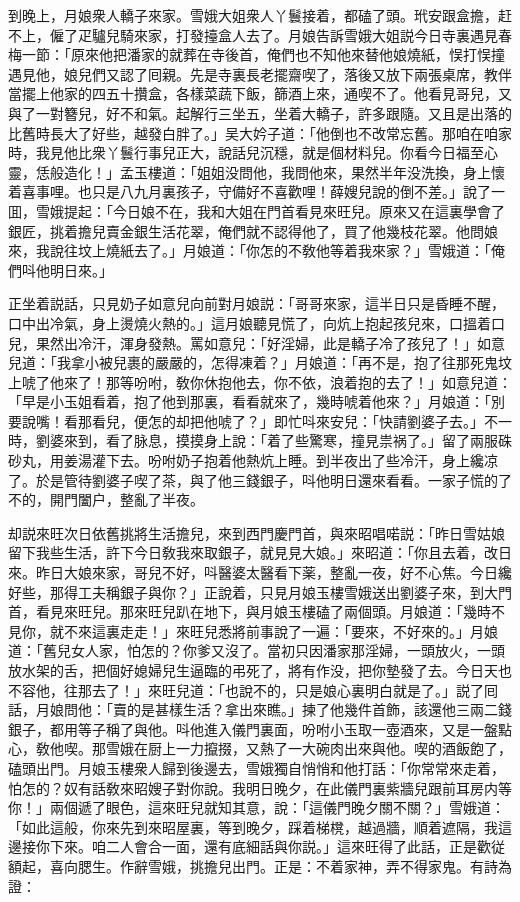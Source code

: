到晚上，月娘衆人轎子來家。雪娥大姐衆人丫鬟接着，都磕了頭。玳安跟盒擔，赶不上，僱了疋驢兒騎來家，打發擡盒人去了。月娘告訴雪娥大姐説今日寺裏遇見春梅一節：「原來他把潘家的就葬在寺後首，俺們也不知他來替他娘燒紙，悮打悮撞遇見他，娘兒們又認了囘親。先是寺裏長老擺齋喫了，落後又放下兩張桌席，教伴當擺上他家的四五十攢盒，各樣菜蔬下飯，篩酒上來，通喫不了。他看見哥兒，又與了一對簪兒，好不和氣。起解行三坐五，坐着大轎子，許多跟隨。又且是出落的比舊時長大了好些，越發白胖了。」吴大妗子道：「他倒也不改常忘舊。那咱在咱家時，我見他比衆丫鬟行事兒正大，說話兒沉穩，就是個材料兒。你看今日福至心靈，恁般造化！」孟玉樓道：「姐姐没問他，我問他來，果然半年没洗換，身上懷着喜事哩。也只是八九月裏孩子，守備好不喜歡哩！薛嫂兒說的倒不差。」說了一囬，雪娥提起：「今日娘不在，我和大姐在門首看見來旺兒。原來又在這裏學會了銀匠，挑着擔兒賣金銀生活花翠，俺們就不認得他了，買了他幾枝花翠。他問娘來，我說往坟上燒紙去了。」月娘道：「你怎的不敎他等着我來家？」雪娥道：「俺們呌他明日來。」

正坐着説話，只見奶子如意兒向前對月娘説：「哥哥來家，這半日只是昏睡不醒，口中出冷氣，身上燙燒火熱的。」這月娘聽見慌了，向炕上抱起孩兒來，口搵着口兒，果然出冷汗，渾身發熱。罵如意兒：「好淫婦，此是轎子冷了孩兒了！」如意兒道：「我拿小被兒裹的嚴嚴的，怎得凍着？」月娘道：「再不是，抱了往那死鬼坟上唬了他來了！那等吩咐，敎你休抱他去，你不依，浪着抱的去了！」如意兒道：「早是小玉姐看着，抱了他到那裏，看看就來了，幾時唬着他來？」月娘道：「別要說嘴！看那看兒，便怎的却把他唬了？」即忙呌來安兒：「快請劉婆子去。」不一時，劉婆來到，看了脉息，摸摸身上說：「着了些驚寒，撞見祟祸了。」留了兩服硃砂丸，用姜湯灌下去。吩咐奶子抱着他熱炕上睡。到半夜出了些冷汗，身上纔凉了。於是管待劉婆子喫了茶，與了他三錢銀子，呌他明日還來看看。一家子慌的了不的，開門闔户，整亂了半夜。

却説來旺次日依舊挑將生活擔兒，來到西門慶門首，與來昭唱喏説：「昨日雪姑娘留下我些生活，許下今日敎我來取銀子，就見見大娘。」來昭道：「你且去着，改日來。昨日大娘來家，哥兒不好，呌醫婆太醫看下薬，整亂一夜，好不心焦。今日纔好些，那得工夫稱銀子與你？」正說着，只見月娘玉樓雪娥送出劉婆子來，到大門首，看見來旺兒。那來旺兒趴在地下，與月娘玉樓磕了兩個頭。月娘道：「幾時不見你，就不來這裏走走！」來旺兒悉將前事說了一遍：「要來，不好來的。」月娘道：「舊兒女人家，怕怎的？你爹又沒了。當初只因潘家那淫婦，一頭放火，一頭放水架的舌，把個好媳婦兒生逼臨的弔死了，將有作没，把你墊發了去。今日天也不容他，往那去了！」來旺兒道：「也說不的，只是娘心裏明白就是了。」説了囘話，月娘問他：「賣的是甚樣生活？拿出來瞧。」揀了他幾件首飾，該還他三兩二錢銀子，都用等子稱了與他。呌他進入儀門裏面，吩咐小玉取一壺酒來，又是一盤點心，敎他喫。那雪娥在厨上一力攛掇，又熱了一大碗肉出來與他。喫的酒飯飽了，磕頭出門。月娘玉樓衆人歸到後邊去，雪娥獨自悄悄和他打話：「你常常來走着，怕怎的？奴有話敎來昭嫂子對你說。我明日晚夕，在此儀門裏紫牆兒跟前耳房内等你！」兩個遞了眼色，這來旺兒就知其意，說：「這儀門晚夕關不關？」雪娥道：「如此這般，你來先到來昭屋裏，等到晚夕，踩着梯櫈，越過牆，順着遮隔，我這邊接你下來。咱二人會合一面，還有底細話與你説。」這來旺得了此話，正是歡従額起，喜向腮生。作辭雪娥，挑擔兒出門。正是：不着家神，弄不得家鬼。有詩為證：


